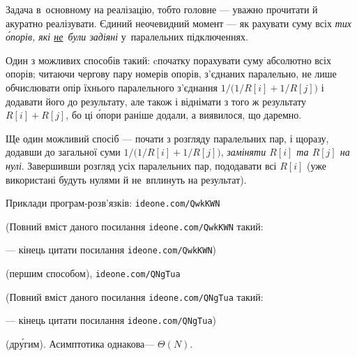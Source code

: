 \documentclass[14pt,a4paper]{extarticle}
\renewcommand{\baselinestretch}{1.3125}
\begin{document}
\Tutorial	Задача в~основному на реалізацію, тобто головне --- уважно прочитати й акуратно реалізувати.
Єдиний неочевидний момент --- як рахувати суму всіх \emph{тих \'{о}порів, які \underline{не}~були задіяні} у~паралельних підключеннях.

Один з можливих способів такий: cпочатку порахувати суму абсолютно всіх опорів; читаючи чергову пару номерів опорів, з’єднаних паралельно, не лише обчислювати опір їхнього паралельного з’єднання $1/\bigl(1/R[i]+1/R[j]\bigr)$ і додавати його до результату, але також і віднімати з того ж результату $R[i]+R[j]$, бо ці \'{о}пори раніше додали, а виявилося, що даремно.

Ще один можливий спосіб --- почати з розгляду паралельних пар, і щоразу, додавши до загальної суми $1/\bigl(1/R[i]+1/R[j]\bigr)$, \emph{заміняти $R[i]$ та $R[j]$ на нулі}. Завершивши розгляд усіх паралельних пар, пододавати всі $R[i]$ (уже використані будуть нулями й не~вплинуть на результат).

Приклади програм-розв’язків: 
\verb"ideone.com/QwkKWN"


{\color{green}\begin{small}

\renewcommand{\baselinestretch}{0.875}

(Повний вміст даного посилання \verb"ideone.com/QwkKWN" такий:

--- кінець цитати посилання \verb"ideone.com/QwkKWN")

\end{small}}


 (першим способом), 
\verb"ideone.com/QNgTua"


{\color{green}\begin{small}

\renewcommand{\baselinestretch}{0.875}

(Повний вміст даного посилання \verb"ideone.com/QNgTua" такий:

--- кінець цитати посилання \verb"ideone.com/QNgTua")

\end{small}}


 (др\'{у}гим). Асимптотика однакова\nolinebreak[3] --- $\Theta(N)$.
\end{document}
